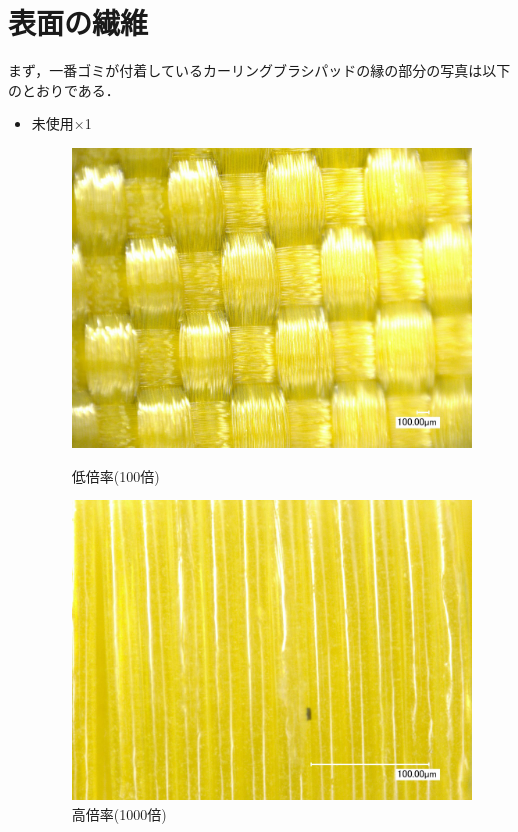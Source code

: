 \documentclass[main]{subfiles}
\begin{document}
\section{表面の繊維}

まず，一番ゴミが付着しているカーリングブラシパッドの縁の部分の写真は以下のとおりである．

\begin{itemize}
    \item 未使用×1
    \begin{figure}[H]
        \centering
        \begin{minipage}[htbp]{0.45\linewidth}
            \centering
            \includegraphics[keepaspectratio, width=0.8\linewidth]{figures/縁/カーリングパッド未使用低倍率.jpg}
            \caption{低倍率(100倍)}
            \label{fig:label}
        \end{minipage}
        \begin{minipage}[htbp]{0.45\linewidth}
            \centering
            \includegraphics[keepaspectratio, width=0.8\linewidth]{figures/縁/カーリングパッド未使用.jpg}
            \caption{高倍率(1000倍)}
            \label{fig:label}
        \end{minipage}
    \end{figure}
    

\end{itemize}
\end{document}
